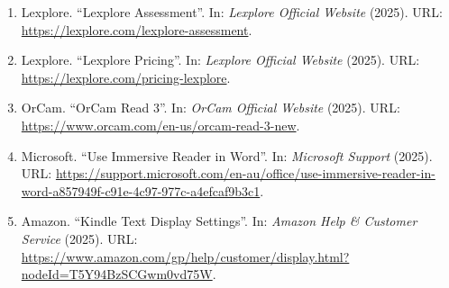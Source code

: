 \begin{enumerate}
\item Lexplore. “Lexplore Assessment”. In: \textit{Lexplore Official Website} (2025). URL: \url{https://lexplore.com/lexplore-assessment}.

\item Lexplore. “Lexplore Pricing”. In: \textit{Lexplore Official Website} (2025). URL: \url{https://lexplore.com/pricing-lexplore}.

\item OrCam. “OrCam Read 3”. In: \textit{OrCam Official Website} (2025). URL: \url{https://www.orcam.com/en-us/orcam-read-3-new}.

\item Microsoft. “Use Immersive Reader in Word”. In: \textit{Microsoft Support} (2025). URL: \url{https://support.microsoft.com/en-au/office/use-immersive-reader-in-word-a857949f-c91e-4c97-977c-a4efcaf9b3c1}.

\item Amazon. “Kindle Text Display Settings”. In: \textit{Amazon Help \& Customer Service} (2025). URL: \url{https://www.amazon.com/gp/help/customer/display.html?nodeId=T5Y94BzSCGwm0vd75W}.

\end{enumerate}